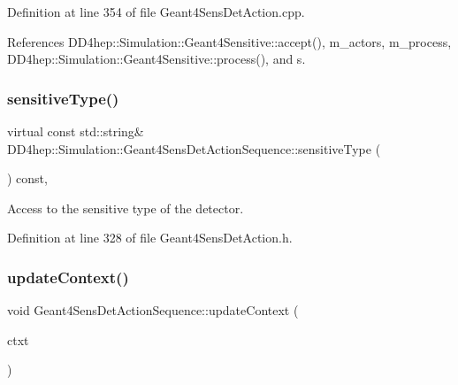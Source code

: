Definition at line 354 of file Geant4\+Sens\+Det\+Action.\+cpp.



References D\+D4hep\+::\+Simulation\+::\+Geant4\+Sensitive\+::accept(), m\+\_\+actors, m\+\_\+process, D\+D4hep\+::\+Simulation\+::\+Geant4\+Sensitive\+::process(), and s.

\hypertarget{class_d_d4hep_1_1_simulation_1_1_geant4_sens_det_action_sequence_aeb8f149bcfbe3211ab24178295b16dde}{}\label{class_d_d4hep_1_1_simulation_1_1_geant4_sens_det_action_sequence_aeb8f149bcfbe3211ab24178295b16dde} 
\subsubsection{\texorpdfstring{sensitive\+Type()}{sensitiveType()}}
{\footnotesize\ttfamily virtual const std\+::string\& D\+D4hep\+::\+Simulation\+::\+Geant4\+Sens\+Det\+Action\+Sequence\+::sensitive\+Type (\begin{DoxyParamCaption}{ }\end{DoxyParamCaption}) const\hspace{0.3cm}{\ttfamily [inline]}, {\ttfamily [virtual]}}



Access to the sensitive type of the detector. 



Definition at line 328 of file Geant4\+Sens\+Det\+Action.\+h.

\hypertarget{class_d_d4hep_1_1_simulation_1_1_geant4_sens_det_action_sequence_a5878271f8da03d02bf4b3b8145246775}{}\label{class_d_d4hep_1_1_simulation_1_1_geant4_sens_det_action_sequence_a5878271f8da03d02bf4b3b8145246775} 
\subsubsection{\texorpdfstring{update\+Context()}{updateContext()}}
{\footnotesize\ttfamily void Geant4\+Sens\+Det\+Action\+Sequence\+::update\+Context (\begin{DoxyParamCaption}\item[{\hyperlink{class_d_d4hep_1_1_simulation_1_1_geant4_context}{Geant4\+Context} $\ast$}]{ctxt }\end{DoxyParamCaption})\hspace{0.3cm}{\ttfamily [virtual]}}



